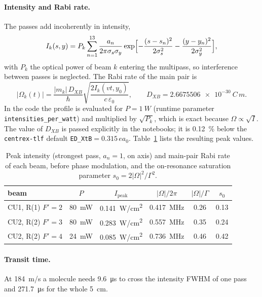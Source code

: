 \documentclass[11pt,a4paper,oneside]{report}
\newcommand{\code}[1]{\texttt{#1}}
\newcommand{\sigs}{\sigma_{s}}
\newcommand{\sigy}{\sigma_{y}}
\newcommand{\Dxb}{D_{XB}}
\begin{document}
\paragraph{Intensity and Rabi rate.} The passes add incoherently in intensity,
\begin{equation}
  I_k(s,y)=P_k\sum_{n=1}^{13}\frac{a_n}{2\pi\sigs\sigy}
  \exp\Bigl[-\frac{(s-s_n)^2}{2\sigs^2}-\frac{(y-y_n)^2}{2\sigy^2}\Bigr],
  \label{eq:intensity}
\end{equation}
with $P_k$ the optical power of beam $k$ entering the multipass, so interference between
passes is neglected. The Rabi rate of the main pair is
\begin{equation}
  |\Omega_k(t)|=\frac{|m_k|\,\Dxb}{\hbar}\sqrt{\frac{2I_k(vt,y_0)}{c\,\varepsilon_0}},
  \qquad \Dxb=\SI{2.6675506e-30}{C\,m}.
  \label{eq:rabi}
\end{equation}
In the code the profile is evaluated for $P=\SI{1}{W}$ (runtime parameter
\code{intensities\_per\_watt}) and multiplied by $\sqrt{P_k}$, which is exact because
$\Omega\propto\sqrt I$. The value of $\Dxb$ is passed explicitly in the notebooks; it is
\SI{0.12}{\percent} below the \code{centrex-tlf} default \code{ED\_XtB}${}=0.315\,ea_0$.
Table~\ref{tab:rabi} lists the resulting peak values.

\begin{table}[htbp]
  \centering
  \caption[Peak intensities and Rabi rates]{Peak intensity (strongest pass, $a_n=1$, on
  axis) and main-pair Rabi rate of each beam, before phase modulation, and the on-resonance
  saturation parameter $s_0=2|\Omega|^2/\Gamma^2$.}
  \label{tab:rabi}
  \small
  \begin{tabular}{lccccc}
    \toprule
    beam & $P$ & $I_{\mathrm{peak}}$ & $|\Omega|/2\pi$ & $|\Omega|/\Gamma$ & $s_0$ \\
    \midrule
    CU1, R(1) $F'=2$ & \SI{80}{mW} & \SI{0.141}{W/cm^2} & \SI{0.417}{MHz} & 0.26 & 0.13 \\
    CU2, R(2) $F'=3$ & \SI{80}{mW} & \SI{0.283}{W/cm^2} & \SI{0.557}{MHz} & 0.35 & 0.24 \\
    CU2, R(2) $F'=4$ & \SI{24}{mW} & \SI{0.085}{W/cm^2} & \SI{0.736}{MHz} & 0.46 & 0.42 \\
    \bottomrule
  \end{tabular}
\end{table}

\paragraph{Transit time.} At \SI{184}{m/s} a molecule needs \SI{9.6}{\micro\second} to cross the
intensity FWHM of one pass and \SI{271.7}{\micro\second} for the whole \SI{5}{cm}.
\end{document}

